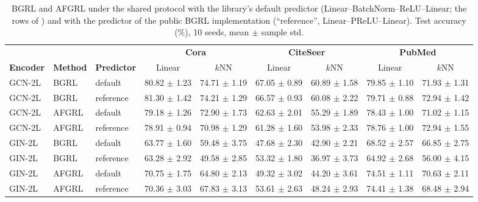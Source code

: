 \documentclass[conference]{IEEEtran}
\begin{document}
\begin{table}[htbp]
\centering
\small
\caption{BGRL and AFGRL under the shared protocol with the library's default predictor (Linear--BatchNorm--ReLU--Linear; the rows of ) and with the predictor of the public BGRL implementation (``reference'', Linear--PReLU--Linear). Test accuracy (\%), 10 seeds, mean $\pm$ sample std.}
\label{tab:predictor}
\begin{tabular}{@{}lllcccccc@{}}
\toprule
& & & \multicolumn{2}{c}{\textbf{Cora}} & \multicolumn{2}{c}{\textbf{CiteSeer}} & \multicolumn{2}{c}{\textbf{PubMed}} \\
\cmidrule(lr){4-5} \cmidrule(lr){6-7} \cmidrule(lr){8-9}
\textbf{Encoder} & \textbf{Method} & \textbf{Predictor} & Linear & $k$NN & Linear & $k$NN & Linear & $k$NN \\ \midrule
GCN-2L & BGRL & default & 80.82 $\pm$ 1.23 & 74.71 $\pm$ 1.19 & 67.05 $\pm$ 0.89 & 60.89 $\pm$ 1.58 & 79.85 $\pm$ 1.10 & 71.93 $\pm$ 1.31 \\
GCN-2L & BGRL & reference & 81.30 $\pm$ 1.42 & 74.21 $\pm$ 1.29 & 66.57 $\pm$ 0.93 & 60.08 $\pm$ 2.22 & 79.71 $\pm$ 0.88 & 72.94 $\pm$ 1.42 \\
GCN-2L & AFGRL & default & 79.18 $\pm$ 1.26 & 72.90 $\pm$ 1.73 & 62.63 $\pm$ 2.01 & 55.29 $\pm$ 1.89 & 78.43 $\pm$ 1.00 & 71.02 $\pm$ 1.15 \\
GCN-2L & AFGRL & reference & 78.91 $\pm$ 0.94 & 70.98 $\pm$ 1.29 & 61.28 $\pm$ 1.60 & 53.98 $\pm$ 2.33 & 78.76 $\pm$ 1.00 & 72.94 $\pm$ 1.55 \\
\midrule
GIN-2L & BGRL & default & 63.77 $\pm$ 1.60 & 59.48 $\pm$ 3.75 & 47.68 $\pm$ 2.30 & 42.90 $\pm$ 2.21 & 68.52 $\pm$ 2.57 & 66.85 $\pm$ 2.75 \\
GIN-2L & BGRL & reference & 63.28 $\pm$ 2.92 & 49.58 $\pm$ 2.85 & 53.32 $\pm$ 1.80 & 36.97 $\pm$ 3.73 & 64.92 $\pm$ 2.68 & 56.00 $\pm$ 4.15 \\
GIN-2L & AFGRL & default & 70.75 $\pm$ 1.75 & 64.80 $\pm$ 2.13 & 49.32 $\pm$ 3.02 & 44.20 $\pm$ 3.61 & 74.51 $\pm$ 1.11 & 70.63 $\pm$ 2.11 \\
GIN-2L & AFGRL & reference & 70.36 $\pm$ 3.03 & 67.83 $\pm$ 3.13 & 53.61 $\pm$ 2.63 & 48.24 $\pm$ 2.93 & 74.41 $\pm$ 1.38 & 68.48 $\pm$ 2.94 \\ \bottomrule
\end{tabular}
\end{table}
\end{document}
